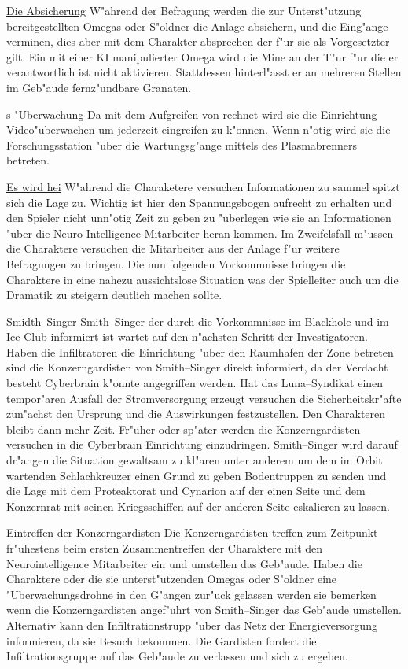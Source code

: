 \underline{Die Absicherung} W"ahrend der Befragung werden die zur Unterst"utzung bereitgestellten Omegas oder S"oldner die Anlage absichern, und die Eing"ange verminen, dies aber mit dem Charakter absprechen der f"ur sie als Vorgesetzter gilt. Ein mit einer KI manipulierter Omega wird die Mine an der T"ur f"ur die er verantwortlich ist nicht aktivieren. Stattdessen hinterl"asst er an mehreren Stellen im Geb"aude fernz"undbare Granaten.

\underline{\xl{}s "Uberwachung}  Da \xl{} mit dem Aufgreifen von \ml{} rechnet wird sie die Einrichtung Video"uberwachen um jederzeit eingreifen zu k"onnen. Wenn n"otig wird sie die Forschungsstation "uber die Wartungsg"ange mittels des Plasmabrenners betreten.

\underline{Es wird hei\3} W"ahrend die Charaketere versuchen Informationen zu sammel spitzt sich die Lage zu. Wichtig ist hier den Spannungsbogen aufrecht zu erhalten und den Spieler nicht unn"otig Zeit zu geben zu "uberlegen wie sie an Informationen "uber die Neuro Intelligence Mitarbeiter heran kommen. Im Zweifelsfall m"ussen die Charaktere versuchen die Mitarbeiter aus der Anlage f"ur weitere Befragungen zu bringen. Die nun folgenden Vorkommnisse bringen die Charaktere in eine nahezu aussichtslose Situation was der Spielleiter auch um die Dramatik zu steigern deutlich machen sollte.

\underline{Smidth--Singer} Smith--Singer der durch die Vorkommnisse im Blackhole und im Ice Club informiert ist wartet auf den n"achsten Schritt der Investigatoren. Haben die Infiltratoren die Einrichtung "uber den Raumhafen der Zone betreten sind die Konzerngardisten von Smith--Singer direkt informiert, da\3 der Verdacht besteht Cyberbrain k"onnte angegriffen werden. Hat das Luna--Syndikat einen tempor"aren Ausfall der Stromversorgung erzeugt versuchen die Sicherheitskr"afte zun"achst den Ursprung und die Auswirkungen festzustellen. Den Charakteren bleibt dann mehr Zeit. Fr"uher oder sp"ater werden die Konzerngardisten versuchen in die Cyberbrain Einrichtung einzudringen. Smith--Singer wird darauf dr"angen die Situation gewaltsam zu kl"aren unter anderem um dem im Orbit wartenden Schlachkreuzer einen Grund zu geben Bodentruppen zu senden und die Lage mit dem Proteaktorat und Cynarion auf der einen Seite und dem Konzernrat mit seinen Kriegsschiffen auf der anderen Seite eskalieren zu lassen. 

\underline{Eintreffen der Konzerngardisten} Die Konzerngardisten treffen zum Zeitpunkt fr"uhestens beim ersten Zusammentreffen der Charaktere mit den Neurointelligence Mitarbeiter ein und umstellen das Geb"aude. Haben die Charaktere oder die sie unterst"utzenden Omegas oder S"oldner eine "Uberwachungsdrohne in den G"angen zur"uck gelassen werden sie bemerken wenn die Konzerngardisten angef"uhrt von Smith--Singer das Geb"aude umstellen. Alternativ kann \xl{} den Infiltrationstrupp "uber das Netz der Energieversorgung informieren, da\3 sie Besuch bekommen. Die Gardisten fordert die Infiltrationsgruppe auf das Geb"aude zu verlassen und sich zu ergeben. 

